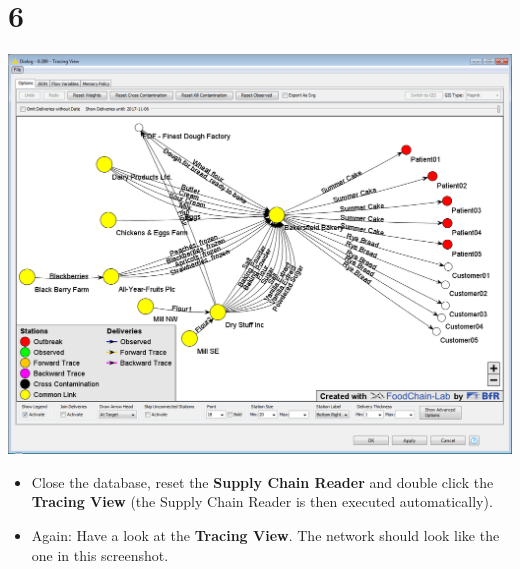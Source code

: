\documentclass[10pt]{beamer}
\begin{document}
\section{6}
\begin{frame}
	\begin{center}
			\includegraphics[height=0.6\textheight]{6.png}
	\end{center}
	\begin{itemize}
		\item Close the database, reset the \textbf{Supply Chain Reader} and double click the \textbf{Tracing View} (the Supply Chain Reader is then executed automatically).
		\item Again: Have a look at the \textbf{Tracing View}. The network should look like the one in this screenshot.
	\end{itemize}
\end{frame}
\end{document}
